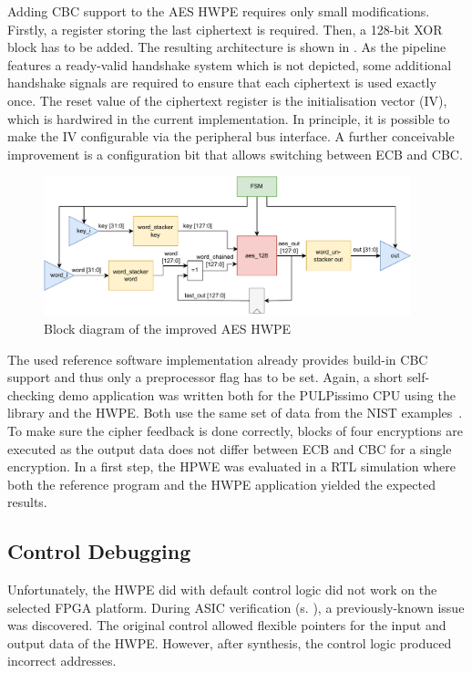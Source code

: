 \documentclass[a4paper, 12pt]{article}
\begin{document}
Adding CBC support to the AES HWPE requires only small modifications. Firstly, a register storing the last ciphertext is required. Then, a 128-bit XOR block has to be added. The resulting architecture is shown in . As the pipeline features a ready-valid handshake system which is not depicted, some additional handshake signals are required to ensure that each ciphertext is used exactly once. The reset value of the ciphertext register is the initialisation vector (IV), which is hardwired in the current implementation. In principle, it is possible to make the IV configurable via the peripheral bus interface. A further conceivable improvement is a configuration bit that allows switching between ECB and CBC.

\begin{figure} [h]
	\centering
	\includegraphics[width=0.95\textwidth]{hwpe_aes_update.pdf}
	\caption{Block diagram of the improved AES HWPE}
	\label{hwpe-aes-update}
\end{figure}

The used reference software implementation \cite{tiny-aes-c} already provides build-in CBC support and thus only a preprocessor flag has to be set. Again, a short self-checking demo application was written both for the PULPissimo CPU using the library and the HWPE. Both use the same set of data from the NIST examples~\cite{NIST}. To make sure the cipher feedback is done correctly, blocks of four encryptions are executed as the output data does not differ between ECB and CBC for a single encryption. In a first step, the HPWE was evaluated in a RTL simulation where both the reference program and the HWPE application yielded the expected results.

\subsection{Control Debugging} \label{sec:improvements:control}

Unfortunately, the HWPE did with default control logic did not work on the selected FPGA platform. During ASIC verification (s. ), a previously-known issue \cite{pulpissimo-issue} was discovered. The original control allowed flexible pointers for the input and output data of the HWPE. However, after synthesis, the control logic produced incorrect addresses. 
\end{document}
